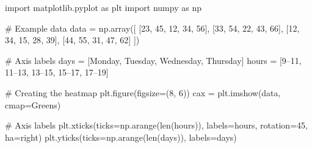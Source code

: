 \documentclass[
  english,
  letterpaper,
  DIV=11,
  numbers=noendperiod]{scrreprt}
\newenvironment{Shaded}{\begin{snugshade}}{\end{snugshade}}
\newcommand{\BuiltInTok}[1]{\textcolor[rgb]{0.00,0.23,0.31}{#1}}
\newcommand{\CommentTok}[1]{\textcolor[rgb]{0.37,0.37,0.37}{#1}}
\newcommand{\DecValTok}[1]{\textcolor[rgb]{0.68,0.00,0.00}{#1}}
\newcommand{\ImportTok}[1]{\textcolor[rgb]{0.00,0.46,0.62}{#1}}
\newcommand{\NormalTok}[1]{\textcolor[rgb]{0.00,0.23,0.31}{#1}}
\newcommand{\OperatorTok}[1]{\textcolor[rgb]{0.37,0.37,0.37}{#1}}
\newcommand{\StringTok}[1]{\textcolor[rgb]{0.13,0.47,0.30}{#1}}
\begin{document}
\begin{Shaded}
\begin{Highlighting}[]
\ImportTok{import}\NormalTok{ matplotlib.pyplot }\ImportTok{as}\NormalTok{ plt}
\ImportTok{import}\NormalTok{ numpy }\ImportTok{as}\NormalTok{ np}

\CommentTok{\# Example data}
\NormalTok{data }\OperatorTok{=}\NormalTok{ np.array([}
\NormalTok{    [}\DecValTok{23}\NormalTok{, }\DecValTok{45}\NormalTok{, }\DecValTok{12}\NormalTok{, }\DecValTok{34}\NormalTok{, }\DecValTok{56}\NormalTok{],}
\NormalTok{    [}\DecValTok{33}\NormalTok{, }\DecValTok{54}\NormalTok{, }\DecValTok{22}\NormalTok{, }\DecValTok{43}\NormalTok{, }\DecValTok{66}\NormalTok{],}
\NormalTok{    [}\DecValTok{12}\NormalTok{, }\DecValTok{34}\NormalTok{, }\DecValTok{15}\NormalTok{, }\DecValTok{28}\NormalTok{, }\DecValTok{39}\NormalTok{],}
\NormalTok{    [}\DecValTok{44}\NormalTok{, }\DecValTok{55}\NormalTok{, }\DecValTok{31}\NormalTok{, }\DecValTok{47}\NormalTok{, }\DecValTok{62}\NormalTok{]}
\NormalTok{])}

\CommentTok{\# Axis labels}
\NormalTok{days }\OperatorTok{=}\NormalTok{ [}\StringTok{\textquotesingle{}Monday\textquotesingle{}}\NormalTok{, }\StringTok{\textquotesingle{}Tuesday\textquotesingle{}}\NormalTok{, }\StringTok{\textquotesingle{}Wednesday\textquotesingle{}}\NormalTok{, }\StringTok{\textquotesingle{}Thursday\textquotesingle{}}\NormalTok{]}
\NormalTok{hours }\OperatorTok{=}\NormalTok{ [}\StringTok{\textquotesingle{}9–11\textquotesingle{}}\NormalTok{, }\StringTok{\textquotesingle{}11–13\textquotesingle{}}\NormalTok{, }\StringTok{\textquotesingle{}13–15\textquotesingle{}}\NormalTok{, }\StringTok{\textquotesingle{}15–17\textquotesingle{}}\NormalTok{, }\StringTok{\textquotesingle{}17–19\textquotesingle{}}\NormalTok{]}

\CommentTok{\# Creating the heatmap}
\NormalTok{plt.figure(figsize}\OperatorTok{=}\NormalTok{(}\DecValTok{8}\NormalTok{, }\DecValTok{6}\NormalTok{))}
\NormalTok{cax }\OperatorTok{=}\NormalTok{ plt.imshow(data, cmap}\OperatorTok{=}\StringTok{\textquotesingle{}Greens\textquotesingle{}}\NormalTok{)}

\CommentTok{\# Axis labels}
\NormalTok{plt.xticks(ticks}\OperatorTok{=}\NormalTok{np.arange(}\BuiltInTok{len}\NormalTok{(hours)), labels}\OperatorTok{=}\NormalTok{hours, rotation}\OperatorTok{=}\DecValTok{45}\NormalTok{, ha}\OperatorTok{=}\StringTok{\textquotesingle{}right\textquotesingle{}}\NormalTok{)}
\NormalTok{plt.yticks(ticks}\OperatorTok{=}\NormalTok{np.arange(}\BuiltInTok{len}\NormalTok{(days)), labels}\OperatorTok{=}\NormalTok{days)}


\end{Highlighting}
\end{Shaded}
\end{document}
